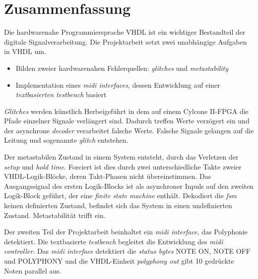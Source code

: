 
\chapter*{Zusammenfassung}


Die hardwarenahe Programmiersprache VHDL ist ein wichtiger Bestandteil der digitale Signalverarbeitung. Die Projektarbeit setzt zwei unabhängige Aufgaben in VHDL um.

\begin{itemize}
\item Bilden zweier hardwarenahen Fehlerquellen: \textit{glitches} und \textit{metastability}
	\item Implementation eines \textit{midi interfaces}, dessen Entwicklung auf einer \textit{textbasierten testbench} basiert
\end{itemize} 

 \textit{Glitches} werden künstlich Herbeigeführt in dem auf einem Cylcone II-FPGA die Pfade einzelner Signale verlängert sind. Dadurch treffen Werte verzögert ein und der asynchrone \textit{decoder} verarbeitet falsche Werte. Falsche Signale gelangen auf die Leitung und sogenannte \textit{glitch} entstehen. 

Der metastabilen Zustand in einem System entsteht, durch das Verletzen der \textit{setup} und \textit{hold time}. Forciert ist dies durch zwei unterschiedliche Takte zweier VHDL-Logik-Blöcke, deren Takt-Phasen nicht übereinstimmen. Das Ausgangssignal des ersten Logik-Blocks ist als asynchroner Inpuls auf den zweiten Logik-Block geführt, der eine \textit{finite state machine} enthält. Dekodiert die \textit{fsm} keinen definierten Zustand, befindet sich das System in einen undefinierten Zustand. Metastabilität trifft ein.

Der zweiten Teil der Projektarbeit beinhaltet ein \textit{midi interface}, das Polyphonie detektiert. Die textbasierte \textit{testbench} begleitet die Entwicklung des \textit{midi controller}. Das \textit{midi interface} detektiert die \textit{status bytes} NOTE ON, NOTE OFF und POLYPHONY und die VHDL-Einheit \textit{polyphony out} gibt 10 gedrückte Noten parallel aus.
